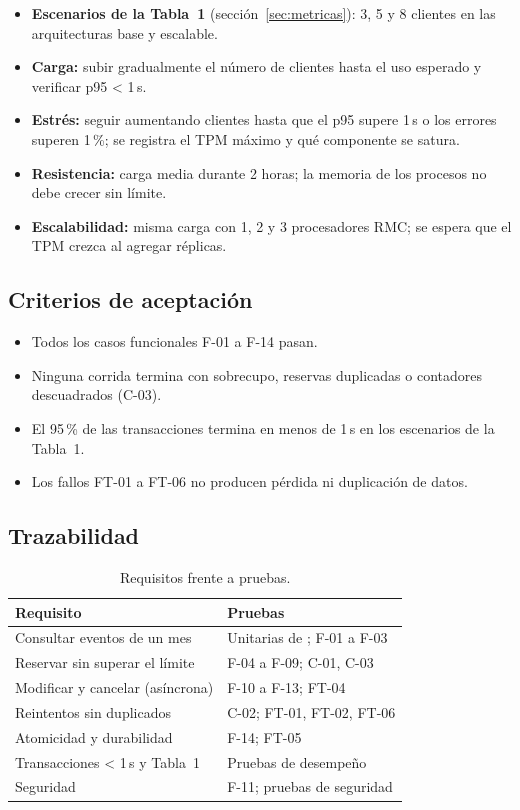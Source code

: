 \begin{itemize}
    \item \textbf{Escenarios de la Tabla~1} (sección~\ref{sec:metricas}): 3, 5 y 8
          clientes en las arquitecturas base y escalable.
    \item \textbf{Carga:} subir gradualmente el número de clientes hasta el uso esperado
          y verificar p95 < 1\,s.
    \item \textbf{Estrés:} seguir aumentando clientes hasta que el p95 supere 1\,s o los
          errores superen 1\,\%; se registra el TPM máximo y qué componente se satura.
    \item \textbf{Resistencia:} carga media durante 2 horas; la memoria de los procesos
          no debe crecer sin límite.
    \item \textbf{Escalabilidad:} misma carga con 1, 2 y 3 procesadores RMC; se espera
          que el TPM crezca al agregar réplicas.
\end{itemize}

\subsection{Criterios de aceptación}

\begin{itemize}
    \item Todos los casos funcionales F-01 a F-14 pasan.
    \item Ninguna corrida termina con sobrecupo, reservas duplicadas o contadores
          descuadrados (C-03).
    \item El 95\,\% de las transacciones termina en menos de 1\,s en los escenarios de
          la Tabla~1.
    \item Los fallos FT-01 a FT-06 no producen pérdida ni duplicación de datos.
\end{itemize}

\subsection{Trazabilidad}

\begin{table}[H]
\centering
\caption{Requisitos frente a pruebas.}
\begin{tabularx}{\textwidth}{p{6.4cm}Y}
\toprule
Requisito & Pruebas \\
\midrule
Consultar eventos de un mes & Unitarias de ; F-01 a F-03 \\
Reservar sin superar el límite & F-04 a F-09; C-01, C-03 \\
Modificar y cancelar (asíncrona) & F-10 a F-13; FT-04 \\
Reintentos sin duplicados & C-02; FT-01, FT-02, FT-06 \\
Atomicidad y durabilidad & F-14; FT-05 \\
Transacciones < 1\,s y Tabla~1 & Pruebas de desempeño \\
Seguridad & F-11; pruebas de seguridad \\
\bottomrule
\end{tabularx}
\end{table}
